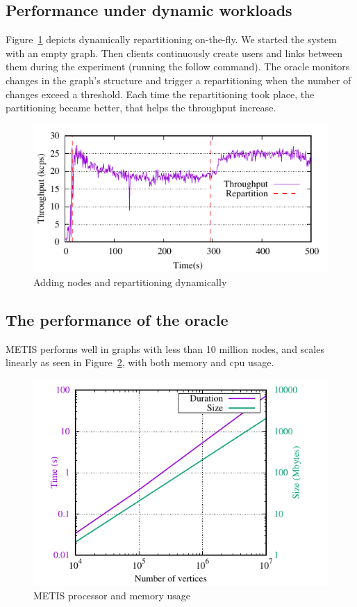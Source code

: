 \subsection{Performance under dynamic workloads}

Figure~\ref{fig:dynamic_load_tput} depicts dynamically repartitioning on-the-fly.
We started the system with an empty graph. Then clients continuously create users and links between them
during the experiment (running the follow command).  The oracle monitors changes in the graph's structure and 
trigger a repartitioning when the number of changes exceed a threshold.
Each time the repartitioning took place, the partitioning became better, that helps the throughput increase. 

\begin{figure}[ht]
	\includegraphics{figures/experiments/dynamicload-tp-move-4p}
	\caption{Adding nodes and repartitioning dynamically}
	\label{fig:dynamic_load_tput}
\end{figure}



\subsection{The performance of the oracle}

METIS performs well in graphs with less than 10 million nodes, and scales linearly as seen in Figure~\ref{fig:metis_size_time}, with both memory and cpu usage.

\begin{figure}[ht!]
  \centering
    \includegraphics[width=\columnwidth]{figures/metis_size_time}
	\caption{METIS processor and memory usage}
	\label{fig:metis_size_time}
\end{figure}

